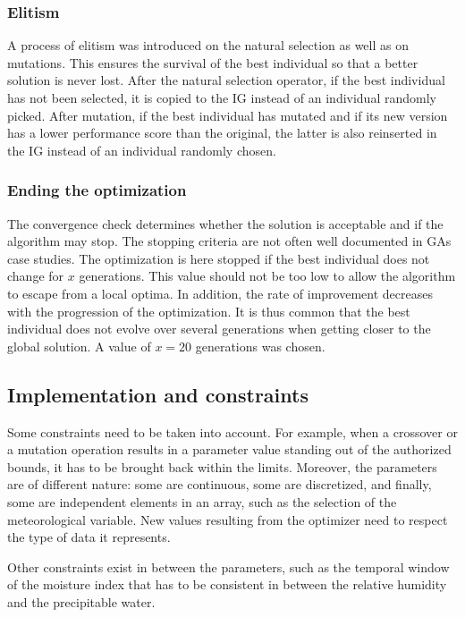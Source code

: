 \documentclass[twocol]{ametsoc}
\begin{document}
\subsubsection{Elitism}

A process of elitism was introduced on the natural selection as well as on mutations. This ensures the survival of the best individual so that a better solution is never lost. After the natural selection operator, if the best individual has not been selected, it is copied to the IG instead of an individual randomly picked. After mutation, if the best individual has mutated and if its new version has a lower performance score than the original, the latter is also reinserted in the IG instead of an individual randomly chosen.


\subsubsection{Ending the optimization}

The convergence check determines whether the solution is acceptable and if the algorithm may stop. The stopping criteria are not often well documented in GAs case studies. The optimization is here stopped if the best individual does not change for $x$ generations. This value should not be too low to allow the algorithm to escape from a local optima. In addition, the rate of improvement decreases with the progression of the optimization. It is thus common that the best individual does not evolve over several generations when getting closer to the global solution. A value of $x=20$ generations was chosen.


\subsection{Implementation and constraints}

Some constraints need to be taken into account. For example, when a crossover or a mutation operation results in a parameter value standing out of the authorized bounds, it has to be brought back within the limits. Moreover, the parameters are of different nature: some are continuous, some are discretized, and finally, some are independent elements in an array, such as the selection of the meteorological variable. New values resulting from the optimizer need to respect the type of data it represents.

Other constraints exist in between the parameters, such as the temporal window of the moisture index \cite[see][]{Horton2016} that has to be consistent in between the relative humidity and the precipitable water.
\end{document}
